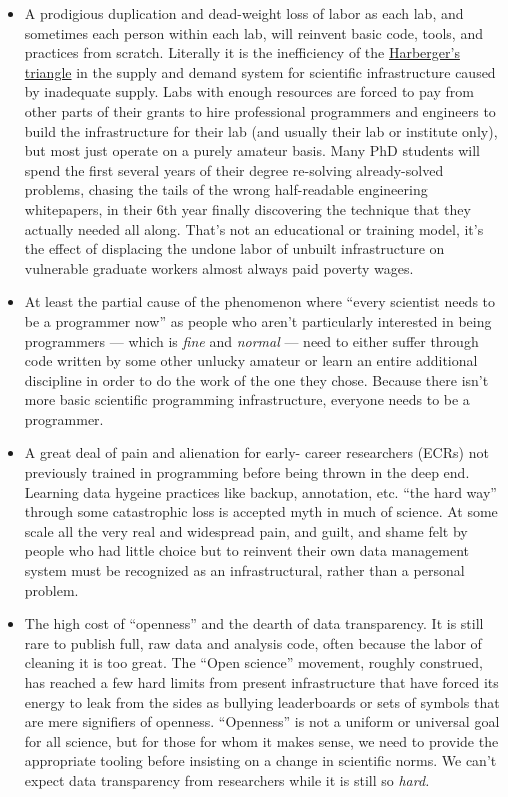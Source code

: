 \documentclass[10pt]{tufte-book}
\begin{document}
\begin{itemize}

\item
  A prodigious duplication and dead-weight loss of labor as each lab,
  and sometimes each person within each lab, will reinvent basic code,
  tools, and practices from scratch. Literally it is the inefficiency of
  the
  \href{https://en.wikipedia.org/wiki/Deadweight_loss\#Harberger's_triangle}{Harberger's
  triangle} in the supply and demand system for scientific
  infrastructure caused by inadequate supply. Labs with enough resources
  are forced to pay from other parts of their grants to hire
  professional programmers and engineers to build the infrastructure for
  their lab (and usually their lab or institute only), but most just
  operate on a purely amateur basis. Many PhD students will spend the
  first several years of their degree re-solving already-solved
  problems, chasing the tails of the wrong half-readable engineering
  whitepapers, in their 6th year finally discovering the technique that
  they actually needed all along. That's not an educational or training
  model, it's the effect of displacing the undone labor of unbuilt
  infrastructure on vulnerable graduate workers almost always paid
  poverty wages.
\item
  At least the partial cause of the phenomenon where ``every scientist
  needs to be a programmer now'' as people who aren't particularly
  interested in being programmers --- which is \emph{fine} and
  \emph{normal} --- need to either suffer through code written by some
  other unlucky amateur or learn an entire additional discipline in
  order to do the work of the one they chose. Because there isn't more
  basic scientific programming infrastructure, everyone needs to be a
  programmer.
\item
  A great deal of pain and alienation for early- career researchers
  (ECRs) not previously trained in programming before being thrown in
  the deep end. Learning data hygeine practices like backup, annotation,
  etc. ``the hard way'' through some catastrophic loss is accepted myth
  in much of science. At some scale all the very real and widespread
  pain, and guilt, and shame felt by people who had little choice but to
  reinvent their own data management system must be recognized as an
  infrastructural, rather than a personal problem.
\item
  The high cost of ``openness'' and the dearth of data transparency. It
  is still rare to publish full, raw data and analysis code, often
  because the labor of cleaning it is too great. The ``Open science''
  movement, roughly construed, has reached a few hard limits from
  present infrastructure that have forced its energy to leak from the
  sides as bullying leaderboards or sets of symbols that are mere
  signifiers of openness. ``Openness'' is not a uniform or universal
  goal for all science, but for those for whom it makes sense, we need
  to provide the appropriate tooling before insisting on a change in
  scientific norms. We can't expect data transparency from researchers
  while it is still so \emph{hard.}
\end{itemize}
\end{document}
